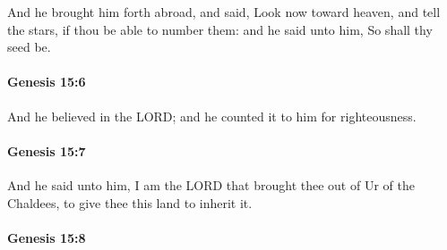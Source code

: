			And he brought him forth abroad, and said, Look now toward heaven, and tell the stars, if thou be able to number them: and he said unto him, So shall thy seed be.


		\paragraph{Genesis 15:6} %
			\label{GENESIS-15-6}

			And he believed in the LORD; and he counted it to him for righteousness.
			
			\begin{framed}
			\scriptsize
				\begin{compactdesc}
					\item[Hebrew] 	
					\item[LXX] \gr{}
				\end{compactdesc}
			\end{framed}

		\paragraph{Genesis 15:7} %
			\label{GENESIS-15-7}

			And he said unto him, I am the LORD that brought thee out of Ur of the Chaldees, to give thee this land to inherit it.


		\paragraph{Genesis 15:8} %
			\label{GENESIS-15-8}

